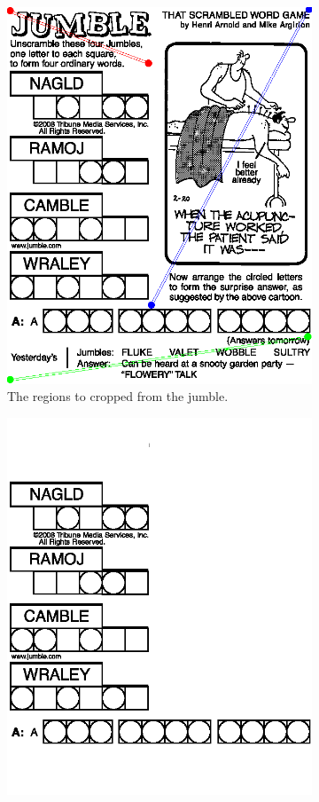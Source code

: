 \documentclass{article}
\begin{document}
	\begin{figure}[h]
		\centering
		\begin{subfigure}{.5\textwidth}
			\centering
			\includegraphics[width=.9\linewidth]{j1_example}
			\caption{The regions to cropped from the jumble.}
			\label{fig:sub1}
		\end{subfigure}%
		\begin{subfigure}{.5\textwidth}
			\centering
			\includegraphics[width=.9\linewidth]{j1_cropped}

\end{subfigure}
\end{figure}
\end{document}
